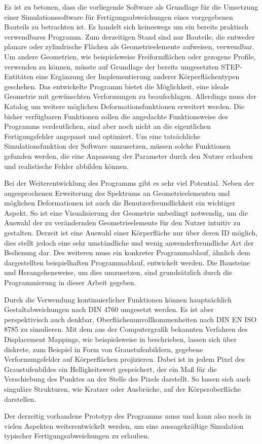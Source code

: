 Es ist zu betonen, dass die vorliegende Software als Grundlage für die Umsetzung einer Simulationssoftware für Fertigungsabweichungen eines vorgegebenen Bauteils zu betrachten ist. Es handelt sich keineswegs um ein bereits praktisch verwendbares Programm.   
Zum derzeitigen Stand sind nur Bauteile, die entweder planare  oder zylindrische Flächen als Geometrieelemente aufweisen, verwendbar. Um andere Geometrien, wie beispielsweise Freiformflächen oder gezogene Profile, verwenden zu können, müsste auf Grundlage der bereits umgesetzten STEP-Entitäten eine Ergänzung der Implementierung anderer Körperflächentypen geschehen. 
Das entwickelte Programm bietet die Möglichkeit, eine ideale Geometrie mit gewünschten Verformungen zu beaufschlagen. Allerdings muss der Katalog um weitere möglichen Deformationsfunktionen erweitert werden. Die bisher verfügbaren Funktionen sollen die angedachte Funktionsweise des Programms verdeutlichen, sind aber noch nicht an die eigentlichen Fertigungsfehler angepasst und optimiert. Um eine tatsächliche Simulationsfunktion der Software umzusetzen, müssen solche Funktionen gefunden werden, die eine Anpassung der Parameter durch den Nutzer erlauben und realistische Fehler abbilden können. 

Bei der Weiterentwicklung des Programms gibt es sehr viel Potential. Neben der angesprochenen Erweiterung des Spektrums an Geometrieelementen und möglichen Deformationen ist auch die Benutzerfreundlichkeit ein wichtiger Aspekt. So ist eine Visualisierung der Geometrie unbedingt notwendig, um die Auswahl der zu verändernden Geometrieelemente für den Nutzer intuitiv zu gestalten. Derzeit ist eine Auswahl einer Körperfläche nur über deren ID möglich, dies stellt jedoch eine sehr umständliche und wenig anwenderfreundliche Art der Bedienung dar. Des weiteren muss ein konkreter Programmablauf, ähnlich dem dargestellten beispielhaften Programmablauf, entwickelt werden. Die Bausteine und Herangehensweise, um dies umzusetzen, sind grundsätzlich durch die Programmierung in dieser Arbeit gegeben.    

Durch die Verwendung kontinuierlicher Funktionen können hauptsächlich Gestaltabweichungen nach DIN 4760 \cite{DIN.4760} umgesetzt werden. Es ist aber perspektivisch auch denkbar, Oberflächenunvollkommenheiten nach DIN EN ISO 8785 \cite{DIN.8785} zu simulieren. Mit dem aus der Computergrafik bekannten Verfahren des Displacement Mappings, wie beispielsweise in \cite{Kalos.2008} beschrieben, lassen sich über diskrete, zum Beispiel in Form von Graustufenbildern, gegebene Verformungsfelder auf Körperflächen projizieren. Dabei ist in jedem Pixel des Graustufenbildes ein Helligkeitswert gespeichert, der ein Maß für die Verschiebung des Punktes an der Stelle des Pixels darstellt. So lassen sich auch singuläre Strukturen, wie Kratzer oder Ausbrüche, auf der Körperoberfläche darstellen. 

Der derzeitig vorhandene Prototyp des Programms muss und kann also noch in vielen Aspekten weiterentwickelt werden, um eine aussagekräftige Simulation typischer Fertigungsabweichungen zu erlauben.    

      



          